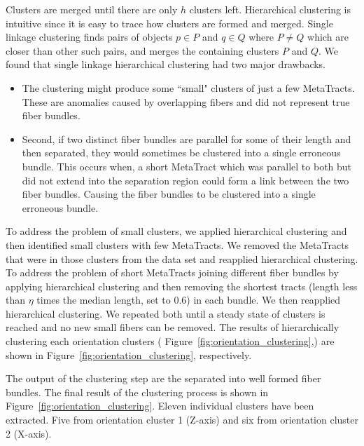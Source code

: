 Clusters are merged until there are only $h$ clusters left.
Hierarchical clustering is intuitive since it is easy to trace how clusters are formed and merged.
Single linkage clustering finds pairs of objects $p \in P$ and $q \in Q$ where $P \neq Q$ which are closer than other such pairs, and merges the containing clusters $P$ and $Q$.
We found that single linkage hierarchical clustering had two major drawbacks.
\begin{itemize}
	\item The clustering might produce some ``small" clusters of just a few MetaTracts.
	These \mt are anomalies caused by overlapping fibers and did not represent true fiber bundles.
	\item Second, if two distinct fiber bundles are parallel for some of their length and then separated, they would sometimes be clustered into a single erroneous bundle.
	This occurs when, a short MetaTract which was parallel to both but did not extend into the separation region could form a link between the two fiber bundles. Causing the fiber bundles to be clustered into a single erroneous bundle.
\end{itemize}

To address the problem of small clusters, we applied hierarchical clustering and then identified small clusters with few MetaTracts.
We removed the MetaTracts that were in those clusters from the data set and reapplied hierarchical clustering.
To address the problem of short MetaTracts joining different fiber bundles by applying hierarchical clustering and then removing the
shortest tracts (length less than $\eta$ times the median length, set to 0.6) in each bundle. We then reapplied hierarchical clustering.
We repeated both until a steady state of clusters is reached and no new small fibers can be removed. The results of hierarchically clustering each orientation clusters ( Figure~\ref{fig:orientation_clustering},) are shown in Figure~\ref{fig:orientation_clustering}, respectively.
 
 
 The output of the clustering step are the \mt separated into well formed fiber bundles. The final result of the clustering process is shown in Figure~\ref{fig:orientation_clustering}. Eleven individual clusters have been extracted. Five from orientation cluster 1 (Z-axis) and six from orientation cluster 2 (X-axis).  
